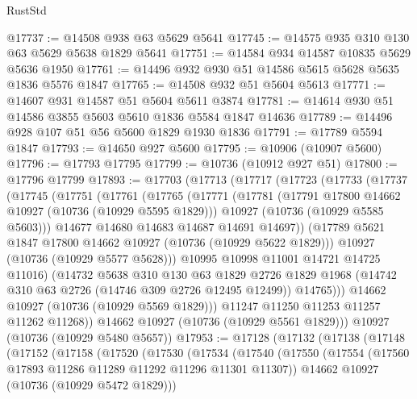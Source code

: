 \begin{lexlean}{RustStd}
\begin{coremodule}
@17737 := @14508 @938 @63 @5629 @5641
@17745 := @14575 @935 @310 @130 @63 @5629 @5638 @1829 @5641
@17751 := @14584 @934 @14587 @10835 @5629 @5636 @1950
@17761 := @14496 @932 @930 @51 @14586 @5615 @5628 @5635 @1836 @5576 @1847
@17765 := @14508 @932 @51 @5604 @5613
@17771 := @14607 @931 @14587 @51 @5604 @5611 @3874
@17781 := @14614 @930 @51 @14586 @3855 @5603 @5610 @1836 @5584 @1847 @14636
@17789 := @14496 @928 @107 @51 @56 @5600 @1829 @1930 @1836
@17791 := @17789 @5594 @1847
@17793 := @14650 @927 @5600
@17795 := @10906 (@10907 @5600)
@17796 := @17793 @17795
@17799 := @10736 (@10912 @927 @51)
@17800 := @17796 @17799
@17893 := @17703
    (@17713
      (@17717
        (@17723
          (@17733
            (@17737
              (@17745
                (@17751
                  (@17761
                    (@17765
                      (@17771
                        (@17781
                          (@17791 @17800 @14662 @10927 (@10736 (@10929 @5595 @1829)))
                          @10927
                          (@10736 (@10929 @5585 @5603)))
                        @14677
                        @14680
                        @14683
                        @14687
                        @14691
                        @14697))
                    (@17789 @5621 @1847 @17800 @14662 @10927 (@10736 (@10929 @5622 @1829)))
                    @10927
                    (@10736 (@10929 @5577 @5628)))
                  @10995
                  @10998
                  @11001
                  @14721
                  @14725
                  @11016)
                (@14732
                  @5638
                  @310
                  @130
                  @63
                  @1829
                  @2726
                  @1829
                  @1968
                  (@14742 @310 @63 @2726 (@14746 @309 @2726 @12495 @12499))
                  @14765)))
            @14662
            @10927
            (@10736 (@10929 @5569 @1829)))
          @11247
          @11250
          @11253
          @11257
          @11262
          @11268))
      @14662
      @10927
      (@10736 (@10929 @5561 @1829)))
    @10927
    (@10736 (@10929 @5480 @5657))
@17953 := @17128
    (@17132
      (@17138
        (@17148
          (@17152
            (@17158
              (@17520
                (@17530
                  (@17534
                    (@17540
                      (@17550
                        (@17554 (@17560 @17893 @11286 @11289 @11292 @11296 @11301 @11307))
                        @14662
                        @10927
                        (@10736 (@10929 @5472 @1829)))

\end{coremodule}
\end{lexlean}
